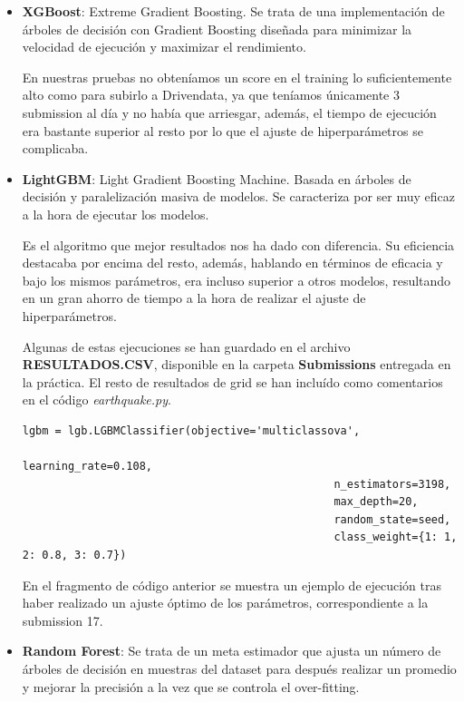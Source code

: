 	
	\begin{itemize}
		
		
		\item \textbf{XGBoost}: Extreme Gradient Boosting. Se trata de una implementación de árboles de decisión con Gradient Boosting diseñada para minimizar la velocidad de ejecución y maximizar el rendimiento.
		
		En nuestras pruebas no obteníamos un score en el training lo suficientemente alto como para subirlo a Drivendata, ya que teníamos únicamente 3 submission al día y no había que arriesgar, además, el tiempo de ejecución era bastante superior al resto por lo que el ajuste de hiperparámetros se complicaba.
		
		
		\item \textbf{LightGBM}: Light Gradient Boosting Machine. Basada en árboles de decisión y paralelización masiva de modelos. Se caracteriza por ser muy eficaz a la hora de ejecutar los modelos.
		
		
		Es el algoritmo que mejor resultados nos ha dado con diferencia. Su eficiencia destacaba por encima del resto, además, hablando en términos de eficacia y bajo los mismos parámetros, era incluso superior a otros modelos, resultando en un gran ahorro de tiempo a la hora de realizar el ajuste de hiperparámetros. 
		
		Algunas de estas ejecuciones se han guardado en el archivo \textbf{RESULTADOS.CSV}, disponible en la carpeta \textbf{Submissions} entregada en la práctica. El resto de resultados de grid se han incluído como comentarios en el código \textit{earthquake.py}.
		
		\newpage
		
		\begin{lstlisting}[frame=single]
lgbm = lgb.LGBMClassifier(objective='multiclassova',
			  									learning_rate=0.108,
								  				n_estimators=3198,
								  				max_depth=20,
											  	random_state=seed,
											  	class_weight={1: 1, 2: 0.8, 3: 0.7})
		\end{lstlisting}
		
		
		En el fragmento de código anterior se muestra un ejemplo de ejecución tras haber realizado un ajuste óptimo de los parámetros, correspondiente a la submission 17.
		
		\item \textbf{Random Forest}: Se trata de un meta estimador que ajusta un número de árboles de decisión en muestras del dataset para después realizar un promedio y mejorar la precisión a la vez que se controla el over-fitting.  
		

\end{itemize}
